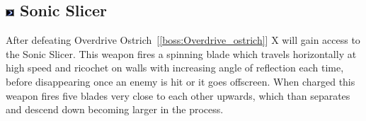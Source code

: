 \subsection{\includegraphics[width=12px, height=10px]{figures/X2/weapons/S_slicer.png} Sonic Slicer}\label{Sonic_slicer}
After defeating Overdrive Ostrich~[\ref{boss:Overdrive_ostrich}] X will gain access to the Sonic Slicer. This weapon fires a spinning blade which travels horizontally at high speed and ricochet on walls with increasing angle of reflection each time, before disappearing once an enemy is hit or it goes offscreen. When charged this weapon fires five blades very close to each other upwards, which than separates and descend down becoming larger in the process.

